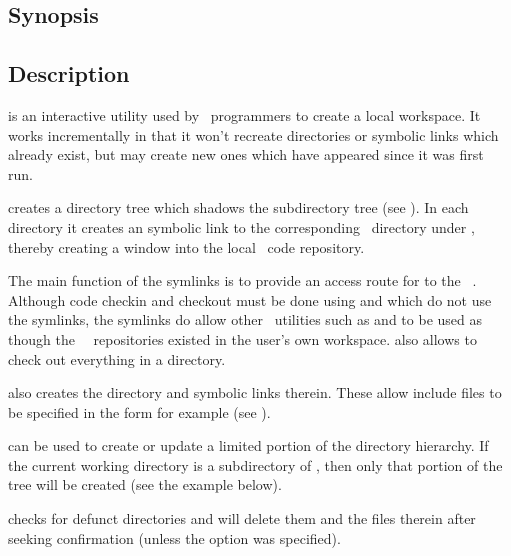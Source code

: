 \subsection*{Synopsis}

\begin{synopsis}
\end{synopsis}

\subsection*{Description}

 is an interactive utility used by \aipspp\ programmers to
create a local workspace.  It works incrementally in that it won't recreate
directories or symbolic links which already exist, but may create new ones
which have appeared since it was first run.

 creates a directory tree which shadows the 
subdirectory tree (see ).  In each directory it creates an
 symbolic link to the corresponding \rcs\ directory under
, thereby creating a window into the local \aipspp\ code
repository.

The main function of the  symlinks is to provide an access route for
 to the \aipspp\ .  Although code checkin and
checkout must be done using  and  which do not use the
 symlinks, the symlinks do allow other \rcs\ utilities such as
 and  to be used as though the \aipspp\ \rcs\ 
repositories existed in the user's own workspace.   also allows
\code{ao RCS/*,v} to check out everything in a directory.

 also creates the  directory and symbolic links
therein.  These allow include files to be specified in the form
 for example (see ).

 can be used to create or update a limited portion of the
directory hierarchy.  If the current working directory is a subdirectory of
\file{*/code}, then only that portion of the tree will be created (see the
example below).

 checks for defunct directories and will delete them and the files
therein after seeking confirmation (unless the \exe{-s} option was specified).

